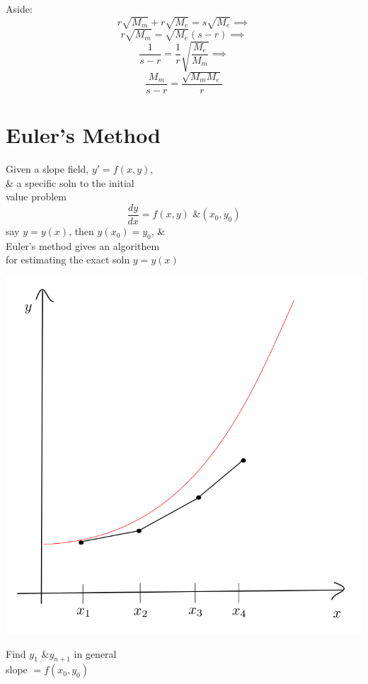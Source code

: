 \documentclass[10pt,a4paper]{article}
\begin{document}
  Aside:
  \[ r \sqrt{M_m}+ r \sqrt{M_e} = s \sqrt{M_e} \implies \]
  \[ r \sqrt{M_m} = \sqrt{M_e}(s-r) \implies \]
  \[ \frac{1}{s-r} = \frac{1}{r} \sqrt{ \frac{M_e}{M_m}} \implies \]
  \[ \frac{M_m}{s-r} = \frac{\sqrt{M_mM_e}}{r} \]

\section*{ Euler's Method}
  Given a slope field, \( y' = f(x, y) \), \\
  \& a specific soln to the initial \\
  value problem 
  \[ \frac{dy}{dx} = f(x, y) \text{ \& } (x_0, y_0) \]
  say \( y = y(x) \), then \( y(x_0) = y_0 \), \& \\
  Euler's method gives an algorithem \\
  for estimating the exact soln \( y = y(x) \) %
  \begin{flushleft}
    \includegraphics[scale=.3]{euler1}
  \end{flushleft}
  Find \( y_1 \text{ \& } y_{n+1} \) in general \\
  slope \( = f(x_0, y_0) \) \\
\end{document}
